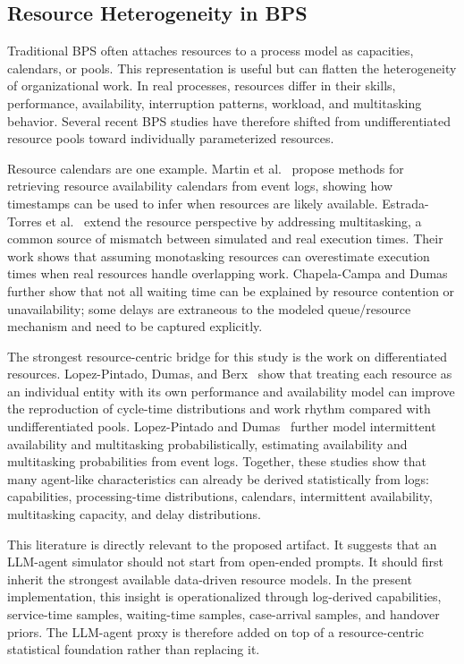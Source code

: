 \subsection{Resource Heterogeneity in
BPS}\label{resource-heterogeneity-in-bps}

Traditional BPS often attaches resources to a process model as
capacities, calendars, or pools. This representation is useful but can
flatten the heterogeneity of organizational work. In real processes,
resources differ in their skills, performance, availability,
interruption patterns, workload, and multitasking behavior. Several
recent BPS studies have therefore shifted from undifferentiated resource
pools toward individually parameterized resources.

Resource calendars are one example. Martin et al.~\cite{martin2020calendars} propose methods
for retrieving resource availability calendars from event logs, showing
how timestamps can be used to infer when resources are likely available.
Estrada-Torres et al.~\cite{estrada2020multitasking} extend the resource perspective by
addressing multitasking, a common source of mismatch between simulated
and real execution times. Their work shows that assuming monotasking
resources can overestimate execution times when real resources handle
overlapping work. Chapela-Campa and Dumas~\cite{chapela2024extraneous} further show that not
all waiting time can be explained by resource contention or
unavailability; some delays are extraneous to the modeled queue/resource
mechanism and need to be captured explicitly.

The strongest resource-centric bridge for this study is the work on
differentiated resources. Lopez-Pintado, Dumas, and Berx~\cite{lopezpintado2024differentiated} show
that treating each resource as an individual entity with its own
performance and availability model can improve the reproduction of
cycle-time distributions and work rhythm compared with undifferentiated
pools. Lopez-Pintado and Dumas~\cite{lopezpintado2025probabilistic} further model intermittent
availability and multitasking probabilistically, estimating availability
and multitasking probabilities from event logs. Together, these studies
show that many agent-like characteristics can already be derived
statistically from logs: capabilities, processing-time distributions,
calendars, intermittent availability, multitasking capacity, and delay
distributions.

This literature is directly relevant to the proposed artifact. It
suggests that an LLM-agent simulator should not start from open-ended
prompts. It should first inherit the strongest available data-driven
resource models. In the present implementation, this insight is
operationalized through log-derived capabilities, service-time samples,
waiting-time samples, case-arrival samples, and handover priors. The
LLM-agent proxy is therefore added on top of a resource-centric
statistical foundation rather than replacing it.

